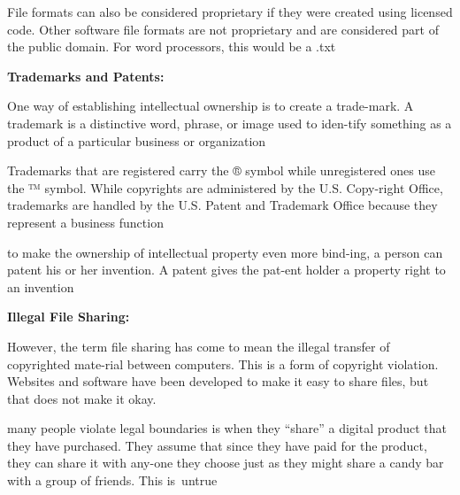 \documentclass{report}
\begin{document}
    \bigbreak \noindent 
    File formats can also be considered proprietary if they were created using licensed code. Other software file formats are not proprietary and are considered part of the public domain. For word processors, this would be a .txt

    \bigbreak \noindent \bigbreak \noindent 
    \begin{Large}
        \textbf{Trademarks and Patents:}
    \end{Large}

    \bigbreak \noindent 
    One way of establishing intellectual ownership is to create a trade-mark. A trademark is a distinctive word, phrase, or image used to iden-tify something as a product of a particular business or organization

    \bigbreak \noindent 
    Trademarks that are registered carry the ® symbol while unregistered ones use the ™ symbol. While copyrights are administered by the U.S. Copy-right Office, trademarks are handled by the U.S. Patent and Trademark Office because they represent a business function

    \bigbreak \noindent 
    to make the ownership of intellectual property even more bind-ing, a person can patent his or her invention. A patent gives the pat-ent holder a property right to an invention

    \pagebreak
    \begin{Large}
        \noindent \textbf{Illegal File Sharing:}
    \end{Large}

    \bigbreak \noindent 
    However, the term file sharing has come to mean the illegal transfer of copyrighted mate-rial between computers. This is a form of copyright violation. Websites and software have been developed to make it easy to share files, but that does not make it okay.

    \bigbreak \noindent 
    many people violate legal boundaries is when they “share” a digital product that they have purchased. They assume that since they have paid for the product, they can share it with any-one they choose just as they might share a candy bar with a group of friends. This is untrue

    \bigbreak \noindent
\end{document}
